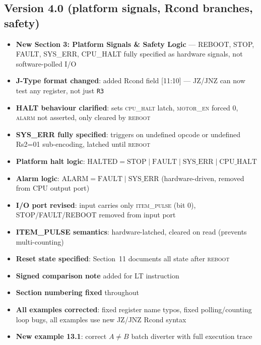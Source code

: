 \documentclass[11pt,a4paper]{article}
\newcommand{\reg}[1]{\texttt{R#1}}
\newcommand{\signal}[1]{\textsc{#1}}
\begin{document}
\subsection*{Version 4.0 (platform signals, Rcond branches, safety)}
\begin{itemize}[nosep]
  \item \textbf{New Section 3: Platform Signals \& Safety Logic} --- REBOOT, STOP, FAULT, SYS\_ERR, CPU\_HALT fully specified as hardware signals, not software-polled I/O
  \item \textbf{J-Type format changed}: added Rcond field [11:10] --- JZ/JNZ can now test any register, not just \reg{3}
  \item \textbf{HALT behaviour clarified}: sets \signal{cpu\_halt} latch, \signal{motor\_en} forced 0, \signal{alarm} not asserted, only cleared by \signal{reboot}
  \item \textbf{SYS\_ERR fully specified}: triggers on undefined opcode or undefined Rs2=01 sub-encoding, latched until \signal{reboot}
  \item \textbf{Platform halt logic}: $\text{HALTED} = \text{STOP} \mid \text{FAULT} \mid \text{SYS\_ERR} \mid \text{CPU\_HALT}$
  \item \textbf{Alarm logic}: $\text{ALARM} = \text{FAULT} \mid \text{SYS\_ERR}$ (hardware-driven, removed from CPU output port)
  \item \textbf{I/O port revised}: input carries only \signal{item\_pulse} (bit 0), STOP/FAULT/REBOOT removed from input port
  \item \textbf{ITEM\_PULSE semantics}: hardware-latched, cleared on read (prevents multi-counting)
  \item \textbf{Reset state specified}: Section~11 documents all state after \signal{reboot}
  \item \textbf{Signed comparison note} added for LT instruction
  \item \textbf{Section numbering fixed} throughout
  \item \textbf{All examples corrected}: fixed register name typos, fixed polling/counting loop bugs, all examples use new JZ/JNZ Rcond syntax
  \item \textbf{New example 13.1}: correct $A \neq B$ batch diverter with full execution trace
\end{itemize}
\end{document}
